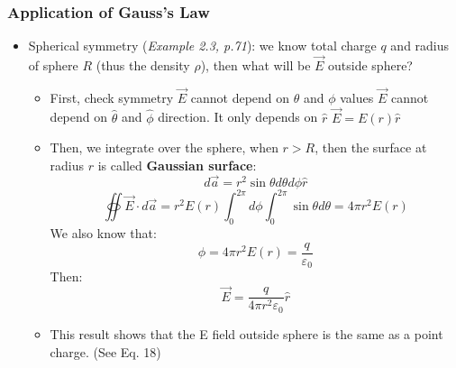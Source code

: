 \documentclass[12pt,a4paper,twoside]{article}
\numberwithin{equation}{section}
\begin{document}
\subsubsection{Application of Gauss's Law}
    \begin{itemize}
        \item Spherical symmetry (\textit{Example 2.3, p.71}): we know total charge $q$ and radius of sphere $R$ (thus the density $\rho$), then what will be $\overrightarrow{E}$ outside sphere?
            \begin{itemize}
                \item First, check symmetry
                    \subitem $\overrightarrow{E}$ cannot depend on $\theta$ and $\phi$ values
                    \subitem $\overrightarrow{E}$ cannot depend on $\hat{\theta}$ and $\hat{\phi}$ direction. It only depends on $\hat{r}$
                    \subitem \(\overrightarrow{E}=E(r)\hat{r}\)
                \item Then, we integrate over the sphere, when $r>R$, then the surface at radius $r$ is called \textbf{Gaussian surface}:
                    \[d\overrightarrow{a}=r^2\sin\theta d\theta d\phi \hat{r}\]
                    \[\oiint \overrightarrow{E}\cdot d\overrightarrow{a}=r^2E(r)\int_{0}^{2\pi}d\phi\int_{0}^{2\pi}\sin\theta d\theta = 4\pi r^2E(r)\]
                    We also know that:
                    \[\phi=4\pi r^2E(r)=\frac{q}{\varepsilon_0}\]
                    Then:
                    \[\overrightarrow{E}=\frac{q}{4\pi r^2\varepsilon_0}\hat{r}\]
                \item This result shows that the E field outside sphere is the same as a point charge. (See Eq. 18)
            \end{itemize}
        

\end{itemize}
\end{document}
